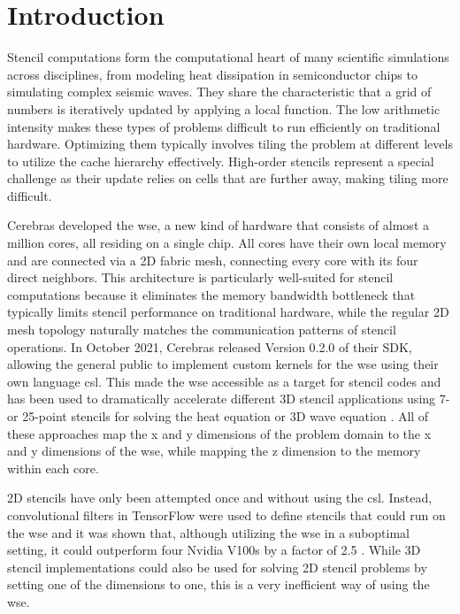 \chapter{Introduction}
Stencil computations form the computational heart of many scientific simulations across disciplines, from modeling heat dissipation in semiconductor chips to simulating complex seismic waves.
They share the characteristic that a grid of numbers is iteratively updated by applying a local function.
The low arithmetic intensity makes these types of problems difficult to run efficiently on traditional hardware.
Optimizing them typically involves tiling the problem at different levels to utilize the cache hierarchy effectively.
High-order stencils represent a special challenge as their update relies on cells that are further away, making tiling more difficult.

Cerebras developed the \acs{wse}, a new kind of hardware that consists of almost a million cores, all residing on a single chip.
All cores have their own local memory and are connected via a 2D fabric mesh, connecting every core with its four direct neighbors.
This architecture is particularly well-suited for stencil computations because it eliminates the memory bandwidth bottleneck that typically limits stencil performance on traditional hardware, while the regular 2D mesh topology naturally matches the communication patterns of stencil operations.
In October 2021, Cerebras released Version 0.2.0 of their SDK, allowing the general public to implement custom kernels for the \ac{wse} using their own language \ac{csl}. 
This made the \ac{wse} accessible as a target for stencil codes and has been used to dramatically accelerate different 3D stencil applications using 7- or 25-point stencils for solving the heat equation or 3D wave equation \cite{jacquelin2022scalable,rocki2020fast,woo2022disruptive,sai2024matrix}.
All of these approaches map the x and y dimensions of the problem domain to the x and y dimensions of the \ac{wse}, while mapping the z dimension to the memory within each core.

2D stencils have only been attempted once and without using the \ac{csl}. Instead, convolutional filters in TensorFlow were used to define stencils that could run on the \ac{wse} and it was shown that, although utilizing the \ac{wse} in a suboptimal setting, it could outperform four Nvidia V100s by a factor of 2.5 \cite{brown2022tensorflow}. While 3D stencil implementations could also be used for solving 2D stencil problems by setting one of the dimensions to one, this is a very inefficient way of using the \ac{wse}.

